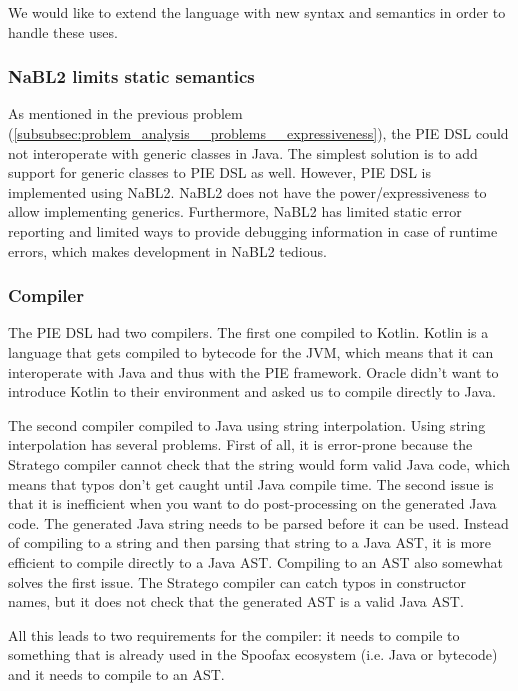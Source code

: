 We would like to extend the language with new syntax and semantics in order to handle these uses.

\subsubsection{NaBL2 limits static semantics}
\label{subsubsec:problem_analysis__problems__nabl2}

As mentioned in the previous problem (\ref{subsubsec:problem_analysis__problems__expressiveness}), the \ac{PIE} \ac{DSL} could not interoperate with generic classes in Java.
The simplest solution is to add support for generic classes to \ac{PIE} \ac{DSL} as well.
However, \ac{PIE} \ac{DSL} is implemented using NaBL2.
NaBL2 does not have the power/expressiveness to allow implementing generics.
Furthermore, NaBL2 has limited static error reporting and limited ways to provide debugging information in case of runtime errors, which makes development in NaBL2 tedious.

\subsubsection{Compiler}
\label{subsubsec:problem_analysis__problems__compiler}

The \ac{PIE} \ac{DSL} had two compilers.
The first one compiled to Kotlin.
Kotlin is a language that gets compiled to bytecode for the JVM, which means that it can interoperate with Java and thus with the \ac{PIE} framework.
Oracle didn't want to introduce Kotlin to their environment and asked us to compile directly to Java.

The second compiler compiled to Java using string interpolation.
Using string interpolation has several problems.
First of all, it is error-prone because the Stratego compiler cannot check that the string would form valid Java code, which means that typos don't get caught until Java compile time.
The second issue is that it is inefficient when you want to do post-processing on the generated Java code.
The generated Java string needs to be parsed before it can be used.
Instead of compiling to a string and then parsing that string to a Java AST, it is more efficient to compile directly to a Java AST.
Compiling to an AST also somewhat solves the first issue.
The Stratego compiler can catch typos in constructor names, but it does not check that the generated AST is a valid Java AST.

All this leads to two requirements for the compiler: it needs to compile to something that is already used in the Spoofax ecosystem (i.e. Java or bytecode) and it needs to compile to an AST.


